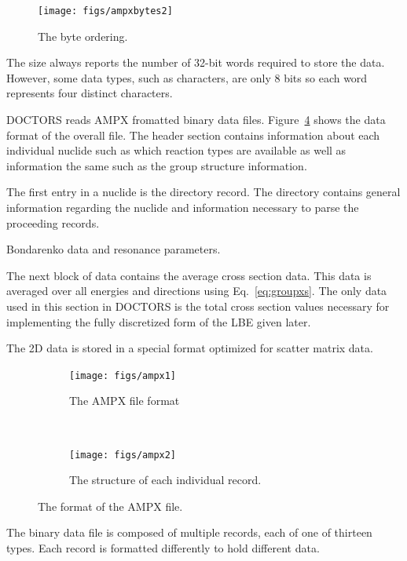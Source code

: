 \begin{figure}[tb]
  \begin{center}
   \texttt{[image: figs/ampxbytes2]}
  \end{center}
  \caption{The byte ordering.}
\label{fig:ampxbytes2}
\end{figure}

The size always reports the number of 32-bit words required to store the data. However, some data types, such as characters, are only 8 bits so each word represents four distinct characters.

DOCTORS reads AMPX fromatted binary data files. Figure~\ref{fig:ampx} shows the data format of the overall file. The header section contains information about each individual nuclide such as which reaction types are available as well as information the same such as the group structure information.

The first entry in a nuclide is the directory record. The directory contains general information regarding the nuclide and information necessary to parse the proceeding records.

Bondarenko data and resonance parameters.

The next block of data contains the average cross section data. This data is averaged over all energies and directions using Eq.~\ref{eq:groupxs}. The only data used in this section in DOCTORS is the total cross section values necessary for implementing the fully discretized form of the LBE given later.

The 2D data is stored in a special format optimized for scatter matrix data.

\begin{figure}
    \centering
    \begin{subfigure}[b]{0.45\textwidth}
        \texttt{[image: figs/ampx1]}
        \caption{The AMPX file format}
        \label{fig:ampx1}
    \end{subfigure}
    ~
    \begin{subfigure}[b]{0.45\textwidth}
        \texttt{[image: figs/ampx2]}
        \caption{The structure of each individual record.}
        \label{fig:ampx2}
    \end{subfigure}
    \caption{The format of the AMPX file.}\label{fig:ampx}
\end{figure}

The binary data file is composed of multiple records, each of one of thirteen types. Each record is formatted differently to hold different data.

